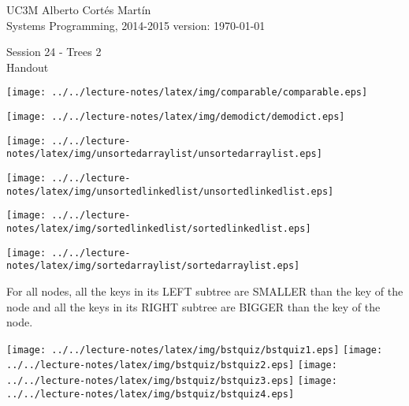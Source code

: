 \documentclass[a4paper, 10pt]{article}
\newcommand{\realtitle}{Session 24 - Trees 2}
\begin{document}
\footnotesize{
\makebox[\linewidth]{\rule{\textwidth}{0.4pt}}
UC3M \hfill Alberto Cortés Martín\\
Systems Programming, 2014-2015 \hfill version: \today\\
\makebox[\linewidth]{\rule{\textwidth}{0.4pt}}
\begin{center}
  \small{\realtitle}\\Handout
\end{center}
\makebox[\linewidth]{\rule{\textwidth}{0.4pt}}
}
\vspace{0.2cm}

\begin{center}
  \texttt{[image: ../../lecture-notes/latex/img/comparable/comparable.eps]}
\end{center}

\begin{center}
  \texttt{[image: ../../lecture-notes/latex/img/demodict/demodict.eps]}
\end{center}

\begin{center}
  \texttt{[image: ../../lecture-notes/latex/img/unsortedarraylist/unsortedarraylist.eps]}
\end{center}

\begin{center}
  \texttt{[image: ../../lecture-notes/latex/img/unsortedlinkedlist/unsortedlinkedlist.eps]}
\end{center}

\begin{center}
  \texttt{[image: ../../lecture-notes/latex/img/sortedlinkedlist/sortedlinkedlist.eps]}
\end{center}

\begin{center}
  \texttt{[image: ../../lecture-notes/latex/img/sortedarraylist/sortedarraylist.eps]}
\end{center}

\newpage

\begin{blackboard}
  For all nodes,
        all the keys in its LEFT  subtree are SMALLER than the key of the node
    and all the keys in its RIGHT subtree are BIGGER  than the key of the node.
\end{blackboard}

\begin{center}
  \texttt{[image: ../../lecture-notes/latex/img/bstquiz/bstquiz1.eps]}
  \texttt{[image: ../../lecture-notes/latex/img/bstquiz/bstquiz2.eps]}
  \texttt{[image: ../../lecture-notes/latex/img/bstquiz/bstquiz3.eps]}
  \texttt{[image: ../../lecture-notes/latex/img/bstquiz/bstquiz4.eps]}
\end{center}
\end{document}
